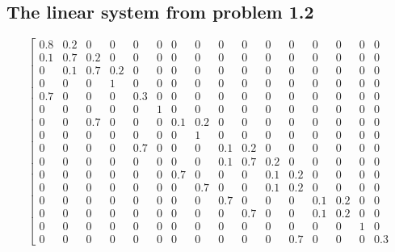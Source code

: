 \documentclass[letterpaper, 10pt]{article}
\begin{document}
\subsection{The linear system from problem 1.2}

\[
\left[
\begin{array}{cccc|cccc|cccc|cccc}
0.8 & 0.2  & 0   & 0   & 0   & 0   & 0   & 0   & 0   & 0   & 0   & 0   & 0   & 0   & 0   & 0   \\ %
0.1 & 0.7  & 0.2 & 0   & 0   & 0   & 0   & 0   & 0   & 0   & 0   & 0   & 0   & 0   & 0   & 0   \\ %
0   & 0.1  & 0.7 & 0.2 & 0   & 0   & 0   & 0   & 0   & 0   & 0   & 0   & 0   & 0   & 0   & 0   \\ %
0   & 0    & 0   & 1   & 0   & 0   & 0   & 0   & 0   & 0   & 0   & 0   & 0   & 0   & 0   & 0   \\ %
\hline
0.7 & 0    & 0   & 0   & 0.3 & 0   & 0   & 0   & 0   & 0   & 0   & 0   & 0   & 0   & 0   & 0   \\ %
0   & 0    & 0   & 0   & 0   & 1   & 0   & 0   & 0   & 0   & 0   & 0   & 0   & 0   & 0   & 0   \\ %
0   & 0    & 0.7 & 0   & 0   & 0   & 0.1 & 0.2 & 0   & 0   & 0   & 0   & 0   & 0   & 0   & 0   \\ %
0   & 0    & 0   & 0   & 0   & 0   & 0   & 1   & 0   & 0   & 0   & 0   & 0   & 0   & 0   & 0   \\ %
\hline
0   & 0    & 0   & 0   & 0.7 & 0   & 0   & 0   & 0.1 & 0.2 & 0   & 0   & 0   & 0   & 0   & 0   \\ %
0   & 0    & 0   & 0   & 0   & 0   & 0   & 0   & 0.1 & 0.7 & 0.2 & 0   & 0   & 0   & 0   & 0   \\ %
0   & 0    & 0   & 0   & 0   & 0   & 0.7 & 0   & 0   & 0   & 0.1 & 0.2 & 0   & 0   & 0   & 0   \\ %
0   & 0    & 0   & 0   & 0   & 0   & 0   & 0.7 & 0   & 0   & 0.1 & 0.2 & 0   & 0   & 0   & 0   \\ %
\hline
0   & 0    & 0   & 0   & 0   & 0   & 0   & 0   & 0.7 & 0   & 0   & 0   & 0.1 & 0.2 & 0   & 0   \\ %
0   & 0    & 0   & 0   & 0   & 0   & 0   & 0   & 0   & 0.7 & 0   & 0   & 0.1 & 0.2 & 0   & 0   \\ %
0   & 0    & 0   & 0   & 0   & 0   & 0   & 0   & 0   & 0   & 0   & 0   & 0   & 0   & 1   & 0   \\ %
0   & 0    & 0   & 0   & 0   & 0   & 0   & 0   & 0   & 0   & 0   & 0.7 & 0   & 0   & 0   & 0.3    %

\end{array}\]
\end{document}
